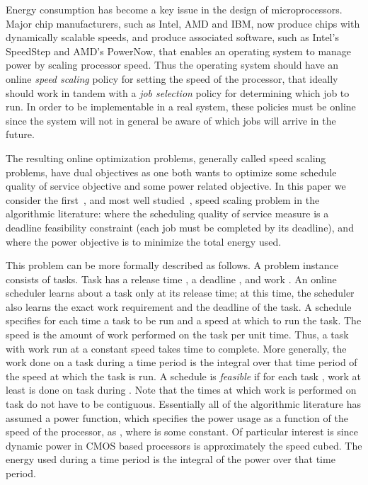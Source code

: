 \documentclass[11pt]{article}
\begin{document}
Energy consumption has become a key issue in the design of microprocessors.
Major chip manufacturers, such as Intel, AMD and IBM,
now produce chips with dynamically scalable speeds,
and produce associated software, such as Intel's SpeedStep and AMD's PowerNow,
that enables an operating system to manage
power by scaling processor speed. Thus the operating system should
have an online {\em speed scaling} policy for setting the speed
of the processor, that ideally should work in tandem with a 
{\em job selection} policy for determining which job to run.
In order to be implementable in a real system, these policies must be online since the
system will not in general be aware of which jobs will arrive in the future.

The resulting online optimization problems, generally called speed scaling
problems, have dual objectives as one both
wants to optimize some schedule quality of service objective
and some power related objective.
In this paper we consider the first~\cite{YDS}, 
and most well studied~\cite{YDS,BBCP,CCL+,BKPSTACS,BKP,LY,LLY,AMS,KK}, speed scaling problem in the
algorithmic literature:
where the scheduling quality of
service measure is a deadline feasibility constraint
(each job must be completed by its deadline), and where the power
objective is to minimize the total energy used.

This problem can be more formally described as follows.
A problem instance consists of  tasks. Task  has a release time
, a deadline , and work .
An online scheduler learns
about a task only at its release time; at this time, the scheduler also learns
the exact work requirement and the deadline of the task.
A schedule specifies for each time a task to be run and a speed at which to
run the task.
The speed is the amount of work performed on the task per unit time.
Thus, a task with work  run at a constant speed  takes time 
to complete.
More generally, the work done on a task during a
time period is the integral over that time period of the speed at which
the task is run.
A schedule is {\em feasible} if for each task , work
at least  is done on task  during .
Note that the times at which work is performed on task  do not have to
be contiguous.
Essentially all of the algorithmic literature has assumed a power function,
which specifies the power  usage as a function of the speed  of
the processor, as , where  is some constant.
Of particular interest is  since dynamic power in 
CMOS based processors is approximately the speed cubed.
The energy used during a time period is the integral of the power
over that time period.
\end{document}
